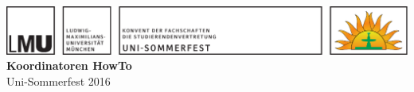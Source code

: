 \documentclass[a4paper,12pt,twoside]{article}
\begin{document}
\begin{center}
  \includegraphics[width=\textwidth]{Briefkopf.pdf} \\
  \vspace{2cm}
  {\Huge\textbf{Koordinatoren HowTo}} \vspace{1cm} \\
  {\large Uni-Sommerfest 2016}
\end{center}
\vfill







\end{document}
